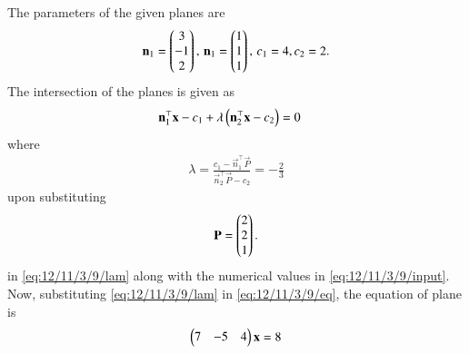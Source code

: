 The parameters of the given planes are
\begin{align}
	\label{eq:12/11/3/9/input}
 \mathbf{n}_1 = \begin{pmatrix}3\\-1\\2\end{pmatrix},\,
 \mathbf{n}_1 = \begin{pmatrix}1\\1\\1\end{pmatrix},\,
	c_1 = 4, c_2 = 2.
\end{align}
The intersection of the planes is given as
\begin{align}
	\label{eq:12/11/3/9/eq}
\mathbf{n}_1^{\top}{\mathbf{x}} - {c}_1 + \lambda\left(\mathbf{n}_2^{\top}{\mathbf{x}} - {c}_2\right) &= 0
\end{align}
where 
\begin{align}
	\label{eq:12/11/3/9/lam}
	\lambda = \frac{{c}_1 - \vec{n}_1^{\top}\vec{P}}{\vec{n}_2^{\top}\vec{P} - {c}_2} 
= -\frac{2}{3}  
\end{align}
upon substituting 
\begin{align}
\mathbf{P} = \begin{pmatrix}2\\2\\1\end{pmatrix}.
\end{align}
	in \eqref{eq:12/11/3/9/lam} along with 
the numerical values in 
	\eqref{eq:12/11/3/9/input}.
	Now, substituting
	\eqref{eq:12/11/3/9/lam}
	in \eqref{eq:12/11/3/9/eq},
the equation of plane is 
\begin{align}
 \begin{pmatrix}7&-5&4\end{pmatrix}\mathbf{x} = 8
\end{align}

